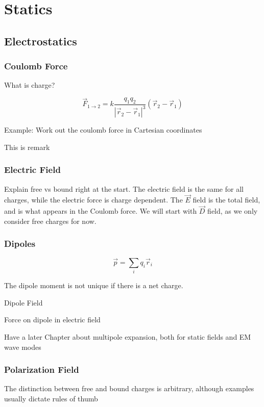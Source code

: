 \documentclass[12pt]{book}
\begin{document}
\part{Statics}

\chapter{Electrostatics}
\section{Coulomb Force}
What is charge?

\begin{definition}
	$$ \vec{F}_{1 \rightarrow 2} = k \frac{q_1 q_2}{|\vec{r}_2 - \vec{r}_1|^3} (\vec{r}_2 - \vec{r}_1)$$
\end{definition}

Example: Work out the coulomb force in Cartesian coordinates

\begin{remark}
	This is remark
\end{remark}

\section{Electric Field}
Explain free vs bound right at the start. The electric field is the same for all charges, while the electric force is charge dependent. The $\Vec{E}$ field is the total field, and is what appears in the Coulomb force.
We will start with $\Vec{D}$ field, as we only consider free charges for now.

\section{Dipoles}

\begin{definition}
	$$ \vec{p} = \sum_i q_i \vec{r}_i$$
\end{definition}

The dipole moment is not unique if there is a net charge.

Dipole Field

Force on dipole in electric field

Have a later Chapter about multipole expansion, both for static fields and EM wave modes


\section{Polarization Field}
\begin{remark}
	The distinction between free and bound charges is arbitrary, although examples usually dictate rules of thumb
\end{remark}
\end{document}
